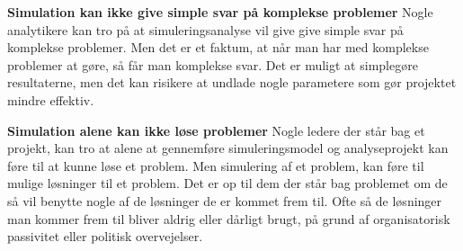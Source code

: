 \vspace{5mm}

\textbf{Simulation kan ikke give simple svar på komplekse problemer}
Nogle analytikere kan tro på at simuleringsanalyse vil give give simple svar på komplekse problemer. Men det er et faktum, at når man har med komplekse problemer at gøre, så får man komplekse svar. Det er muligt at simplegøre resultaterne, men det kan risikere at undlade nogle parametere som gør projektet mindre effektiv.

\vspace{5mm}

\textbf{Simulation alene kan ikke løse problemer}
Nogle ledere der står bag et projekt, kan tro at alene at gennemføre simuleringsmodel og analyseprojekt kan føre til at kunne løse et problem. Men simulering af et problem, kan føre til mulige løsninger til et problem. Det er op til dem der står bag problemet om de så vil benytte nogle af de løsninger de er kommet frem til.  Ofte så de løsninger man kommer frem til bliver aldrig eller dårligt brugt, på grund af organisatorisk passivitet eller politisk overvejelser.